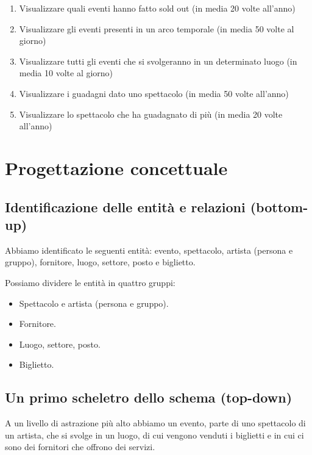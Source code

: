 \documentclass[a4paper,11pt]{article}
\begin{document}
\begin{enumerate}
    \item \label{search-sold-out-events} Visualizzare quali eventi hanno fatto sold out (in media 20 volte all'anno)
    \item \label{search-events-by-date} Visualizzare gli eventi presenti in un arco temporale (in media 50 volte al giorno)
    \item \label{search-events-by-venue} Visualizzare tutti gli eventi che si svolgeranno in un determinato luogo (in media 10 volte al giorno)
    \item \label{search-earnings-by-show} Visualizzare i guadagni dato uno spettacolo (in media 50 volte all'anno)
    \item \label{show-max-earnings} Visualizzare lo spettacolo che ha guadagnato di più (in media 20 volte all'anno)
\end{enumerate}

\section{Progettazione concettuale}

\subsection{Identificazione delle entità e relazioni (bottom-up)}

Abbiamo identificato le seguenti entità: evento, spettacolo, artista (persona e gruppo), fornitore, luogo, settore, posto e biglietto.

Possiamo dividere le entità in quattro gruppi:

\begin{itemize}
    \item Spettacolo e artista (persona e gruppo).
    \item Fornitore.
    \item Luogo, settore, posto.
    \item Biglietto.
\end{itemize}

\pagebreak
\subsection{Un primo scheletro dello schema (top-down)}

A un livello di astrazione più alto abbiamo un evento, parte di uno spettacolo di un artista, che si svolge in un luogo, di cui vengono venduti i biglietti e in cui ci sono dei fornitori che offrono dei servizi.
\end{document}
